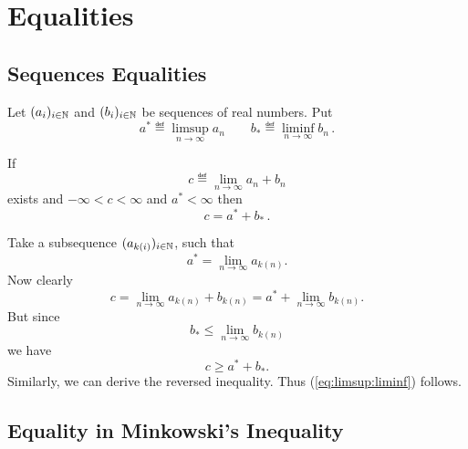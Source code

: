 \section{Equalities}

\subsection{Sequences Equalities}

\begin{llem} \label{lem:limsup:liminf}
Let \((a_i)_{i\in\mathbb{N}}\) and \((b_i)_{i\in\mathbb{N}}\) be sequences of real numbers.
Put
\begin{equation*}
a^{*} \eqdef \limsup_{n\to\infty} a_n \qquad
b_{*} \eqdef \liminf_{n\to\infty} b_n\,.
\end{equation*}

If
\begin{equation*}
 c \eqdef \lim_{n\to\infty} a_n + b_n
\end{equation*}
exists and \(-\infty < c < \infty\) and \(a^{*} < \infty\)
then
\begin{equation} \label{eq:limsup:liminf}
 c = a^{*} + b_{*}\,.
\end{equation}
\end{llem}
\begin{thmproof}
Take a subsequence \((a_{k(i)})_{i\in\mathbb{N}}\), such that
\begin{equation*}
a^{*} = \lim_{n\to\infty} a_{k(n)}.
\end{equation*}
Now clearly
\begin{equation*}
 c = \lim_{n\to\infty} a_{k(n)} + b_{k(n)} = a^{*} + \lim_{n\to\infty} b_{k(n)}.
\end{equation*}
But since
\begin{equation*}
 b_{*} \leq \lim_{n\to\infty} b_{k(n)}
\end{equation*}
we have
\begin{equation}
 c \geq a^{*} + b_{*}.
\end{equation}
Similarly, we can derive the reversed inequality.
Thus (\ref{eq:limsup:liminf}) follows.
\end{thmproof}


\subsection{Equality in Minkowski's Inequality}

